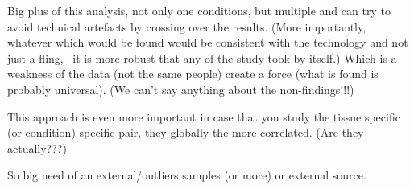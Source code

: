 Big plus of this analysis, not only one conditions, but multiple and can try to
avoid technical artefacts by crossing over the results. (More importantly, whatever
which would be found would be consistent with the technology and not just a fling,
\ie\ it is more robust that any of the study took by itself.)
Which is a weakness of the data (not the same people) create a force (what is found
is probably universal). (We can't say anything about the non-findings!!!)

This approach is even more important in case that you study the tissue specific
(or condition) specific pair, they globally the more correlated. (Are they actually???)

So big need of an external/outliers samples (or more) or external source.


\begin{comment}
\TK{Proteome sensé être plus conserver que le RNA : citation}
\end{comment}















